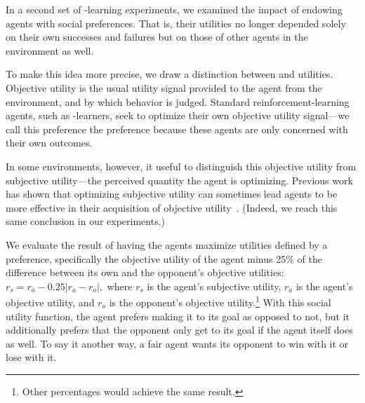 
In a second set of \Q-learning experiments, we examined the impact of
endowing agents with social preferences. That is, their
utilities no longer depended solely on their own successes and
failures but on those of other agents in the environment as
well.

To make this idea more precise, we draw a distinction
between  and  utilities.
Objective utility is the usual utility
signal provided to the agent from the environment, and by which
behavior is judged. Standard reinforcement-learning agents, such
as \Q-learners, seek to optimize their own objective utility
signal---we call this preference the  preference
because these agents are only concerned with their own outcomes.

In some environments, however, it useful to distinguish this objective
utility from subjective utility---the perceived quantity the agent is
optimizing. Previous work has shown that optimizing subjective utility
can sometimes lead agents to be more effective in their acquisition of
objective utility~\cite{singh2009rewards}.  (Indeed, we reach this same
conclusion in our experiments.)


We evaluate the result of having the agents maximize utilities defined
by a  preference, specifically the objective utility
of the agent minus 25\% of the difference between its own and the
opponent's objective utilities: $r_{s} = r_{a} - 0.25 \left| r_{a} -
r_{o} \right|,$ where $r_{s}$ is the agent's subjective utility,
$r_{a}$ is the agent's objective utility, and $r_{o}$ is the opponent's
objective utility.\footnote{Other percentages would achieve the same
result.}  
With this social utility function, the agent prefers making it to its goal as opposed to not,
but it additionally prefers that the opponent only get to its goal if
the agent itself does as well. To say it another way, a fair agent
wants its opponent to win with it or lose with it.

